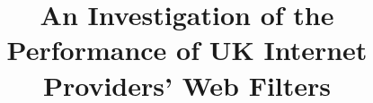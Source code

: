 \documentclass{bmcart}
\begin{document}
\begin{frontmatter}

\begin{fmbox}

\title{An Investigation of the Performance of UK Internet Providers' Web Filters}

\author[
   addressref={lancs},                   %
   corref={lancs},                       %
   email={m.rowe@lancaster.ac.uk}   %
]{ }
\author[
   addressref={org},                   %
   email={richard@openrightsgroup.org}   %
]{ }

\address[id=lancs]{%
  , %
  ,                     %
  ,                              %
}
\address[id=org]{%
  , %
  ,                     %
  ,                              %
}

\end{fmbox}%

\begin{abstractbox}


\end{abstractbox}
\end{frontmatter}
\end{document}
